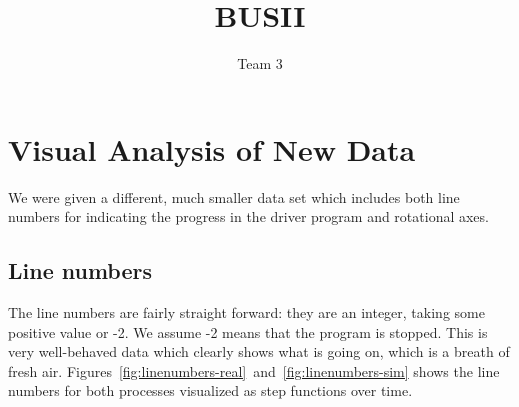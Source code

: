 \documentclass[english]{scrartcl}
\begin{document}
\title{BUSII}

\author{Team 3}

\maketitle
\tableofcontents

\section{Visual Analysis of New Data}

We were given a different, much smaller data set which includes both line numbers
for indicating the progress in the driver program and rotational axes.

\subsection{Line numbers}

The line numbers are fairly straight forward: they are an integer, taking some positive value or -2.
We assume -2 means that the program is stopped. This is very well-behaved data which clearly shows
what is going on, which is a breath of fresh air. Figures~\ref{fig:linenumbers-real}~and~\ref{fig:linenumbers-sim} shows the line numbers
for both processes visualized as step functions over time.
\end{document}
